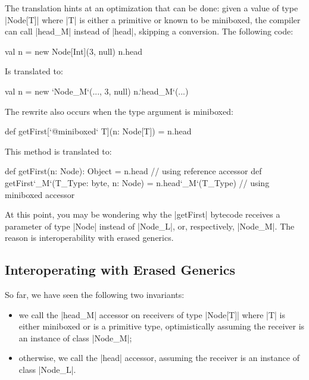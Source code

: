 The translation hints at an optimization that can be done: given a value of type |Node[T]| where |T| is either a primitive or known to be miniboxed, the compiler can call |head_M| instead of |head|, skipping a conversion. The following code:

\begin{lstlisting-nobreak}
 val n = new Node[Int](3, null)
 n.head
\end{lstlisting-nobreak}

Is translated to:

\begin{lstlisting-nobreak}
 val n = new `Node_M`(..., 3, null)
 n.`head_M`(...)
\end{lstlisting-nobreak}

The rewrite also occurs when the type argument is miniboxed:

\begin{lstlisting-nobreak}
 def getFirst[`@miniboxed` T](n: Node[T]) = n.head
\end{lstlisting-nobreak}

This method is translated to:

\begin{lstlisting-nobreak}
 def getFirst(n: Node): Object =
   n.head                 // using reference accessor
 def getFirst`_M`(T_Type: byte, n: Node) =
   n.head`_M`(T_Type) // using miniboxed accessor
\end{lstlisting-nobreak}

At this point, you may be wondering why the |getFirst| bytecode receives a parameter of type |Node| instead of |Node_L|, or, respectively, |Node_M|. The reason is interoperability with erased generics.



\subsection{Interoperating with Erased Generics}


So far, we have seen the following two invariants:
\begin{itemize}
 \item we call the |head_M| accessor on receivers of type |Node[T]| where |T| is either miniboxed or is a primitive type, optimistically assuming the receiver is an instance of class |Node_M|;
 \item otherwise, we call the |head| accessor, assuming the receiver is an instance of class |Node_L|.
\end{itemize}

